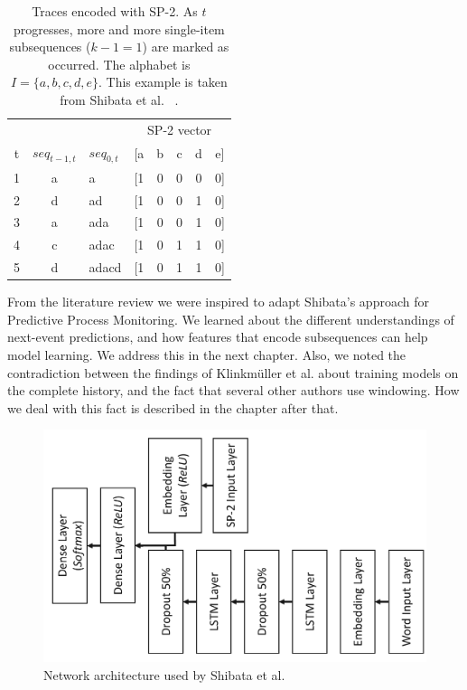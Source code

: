 \begin{table}[!htb]
    \centering
    \begin{tabular}{cclccccc}
        \hline
          &      &              & \multicolumn{5}{c}{SP-2 vector}\\
        t & $seq_{t-1, t}$ & $seq_{0,t}$ & [a & b & c & d & e]\\
        \hline
        1 & a    & a            & [1 & 0 & 0 & 0 & 0]\\
        2 & d    & ad           & [1 & 0 & 0 & 1 & 0]\\
        3 & a    & ada          & [1 & 0 & 0 & 1 & 0]\\
        4 & c    & adac         & [1 & 0 & 1 & 1 & 0]\\
        5 & d    & adacd        & [1 & 0 & 1 & 1 & 0]\\
        \hline
    \end{tabular}
    \caption[SP-2 feature vector example]{Traces encoded with SP-2. As $t$ progresses, more and more single-item subsequences ($k-1=1$) are marked as occurred. The alphabet is $I=\{a,b,c,d,e\}$. This example is taken from Shibata et al. ~\cite{shibata2016bipartite}.}
    \label{tab:sp2-encoding}
\end{table}


From the literature review we were inspired to adapt Shibata's approach for Predictive Process Monitoring.
We learned about the different understandings of next-event predictions, and how
features that encode subsequences can help model learning. We address this in the next chapter.
Also, we noted the contradiction between the findings of Klinkmüller et al. about training models on the complete history, and the fact that several other authors use windowing.
How we deal with this fact is described in the chapter after that.

\begin{figure}
    \centering
    \includegraphics[width=.8\textwidth,angle=-90,origin=c]{gfx/spice-winner-architecture.pdf}
    \caption{Network architecture used by Shibata et al.}
    \label{fig:spice-winner-architecture}
\end{figure}
